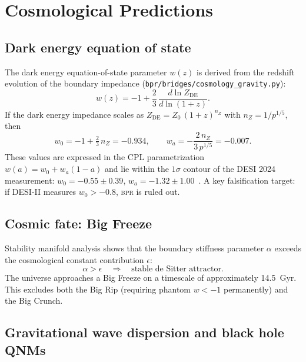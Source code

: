 \documentclass[aps,prd,twocolumn,superscriptaddress,longbibliography,nofootinbib]{revtex4-2}
\newcommand{\Zimp}{Z}
\newcommand{\Zvac}{Z_0}
\newcommand{\bpr}{\textsc{bpr}}
\begin{document}
\section{Cosmological Predictions}
\label{sec:cosmo}

\subsection{Dark energy equation of state}

The dark energy equation-of-state parameter $w(z)$ is derived from
the redshift evolution of the boundary impedance
(\texttt{bpr/bridges/cosmology\_gravity.py}):
\begin{equation}
w(z) = -1 + \frac{2}{3}\, \frac{d\ln \Zimp_{\mathrm{DE}}}{d\ln(1+z)}.
\label{eq:wz}
\end{equation}
If the dark energy impedance scales as $\Zimp_{\mathrm{DE}} =
\Zvac\, (1+z)^{n_Z}$ with $n_Z = 1/p^{1/5}$, then
\begin{equation}
w_0 = -1 + \tfrac{2}{3}\, n_Z = -0.934, \qquad
w_a = -\frac{2\, n_Z}{3\, p^{1/5}} = -0.007.
\label{eq:w0wa}
\end{equation}
These values are expressed in the CPL parametrization $w(a) = w_0 +
w_a(1-a)$ and lie within the $1\sigma$ contour of the DESI 2024
measurement: $w_0 = -0.55 \pm 0.39$, $w_a = -1.32 \pm
1.00$~\cite{DESI2024}.  A key falsification target: if DESI-II
measures $w_0 > -0.8$, \bpr{} is ruled out.

\subsection{Cosmic fate: Big Freeze}

Stability manifold analysis shows that the boundary stiffness
parameter $\alpha$ exceeds the cosmological constant contribution
$\epsilon$:
\begin{equation}
\alpha > \epsilon \quad \Longrightarrow \quad
\text{stable de Sitter attractor}.
\label{eq:cosmic_fate}
\end{equation}
The universe approaches a Big Freeze on a timescale of approximately
14.5~Gyr.  This excludes both the Big Rip (requiring phantom
$w < -1$ permanently) and the Big Crunch.

\subsection{Gravitational wave dispersion and black hole QNMs}
\end{document}

